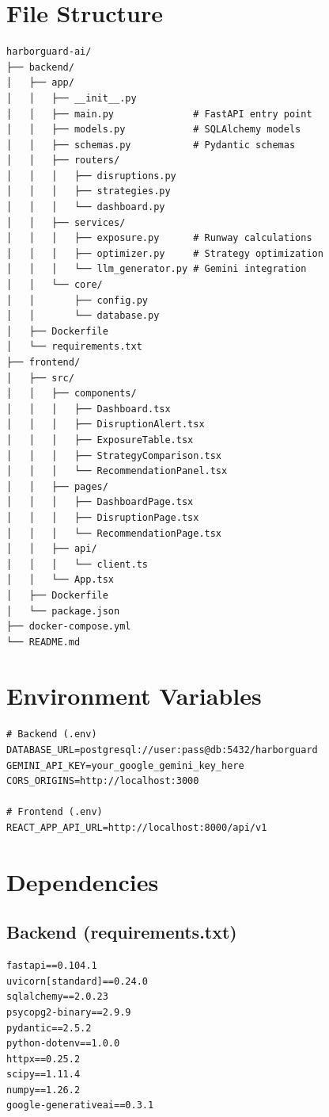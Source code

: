 \documentclass[11pt]{article}
\begin{document}
\newpage

\section{File Structure}

\begin{lstlisting}
harborguard-ai/
├── backend/
│   ├── app/
│   │   ├── __init__.py
│   │   ├── main.py              # FastAPI entry point
│   │   ├── models.py            # SQLAlchemy models
│   │   ├── schemas.py           # Pydantic schemas
│   │   ├── routers/
│   │   │   ├── disruptions.py
│   │   │   ├── strategies.py
│   │   │   └── dashboard.py
│   │   ├── services/
│   │   │   ├── exposure.py      # Runway calculations
│   │   │   ├── optimizer.py     # Strategy optimization
│   │   │   └── llm_generator.py # Gemini integration
│   │   └── core/
│   │       ├── config.py
│   │       └── database.py
│   ├── Dockerfile
│   └── requirements.txt
├── frontend/
│   ├── src/
│   │   ├── components/
│   │   │   ├── Dashboard.tsx
│   │   │   ├── DisruptionAlert.tsx
│   │   │   ├── ExposureTable.tsx
│   │   │   ├── StrategyComparison.tsx
│   │   │   └── RecommendationPanel.tsx
│   │   ├── pages/
│   │   │   ├── DashboardPage.tsx
│   │   │   ├── DisruptionPage.tsx
│   │   │   └── RecommendationPage.tsx
│   │   ├── api/
│   │   │   └── client.ts
│   │   └── App.tsx
│   ├── Dockerfile
│   └── package.json
├── docker-compose.yml
└── README.md
\end{lstlisting}
\section{Environment Variables}

\begin{lstlisting}[basicstyle=\ttfamily\small]
# Backend (.env)
DATABASE_URL=postgresql://user:pass@db:5432/harborguard
GEMINI_API_KEY=your_google_gemini_key_here
CORS_ORIGINS=http://localhost:3000

# Frontend (.env)
REACT_APP_API_URL=http://localhost:8000/api/v1
\end{lstlisting}

\section{Dependencies}

\subsection{Backend (requirements.txt)}
\begin{lstlisting}[basicstyle=\ttfamily\small]
fastapi==0.104.1
uvicorn[standard]==0.24.0
sqlalchemy==2.0.23
psycopg2-binary==2.9.9
pydantic==2.5.2
python-dotenv==1.0.0
httpx==0.25.2
scipy==1.11.4
numpy==1.26.2
google-generativeai==0.3.1
\end{lstlisting}
\end{document}
